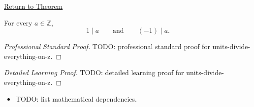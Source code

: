 \newpage
{}
\label{prf:units-divide-everything-on-z}

\begin{remark*}[Return]
\hyperref[prop:units-divide-everything-on-z]{Return to Theorem}
\end{remark*}

\begin{proposition*}
For every $a\in\mathbb{Z}$,
\[
1\mid a
\qquad\text{and}\qquad
(-1)\mid a.
\]
\end{proposition*}

\begin{proof}[Professional Standard Proof]
\LRAProofBodyStart
TODO: professional standard proof for units-divide-everything-on-z.
\end{proof}

\begin{proof}[Detailed Learning Proof]
\LRAProofBodyStart
TODO: detailed learning proof for units-divide-everything-on-z.
\end{proof}

\begin{remark*}
\end{remark*}

\begin{dependencies}
\begin{itemize}
  \item TODO: list mathematical dependencies.
\end{itemize}
\end{dependencies}

\clearpage
